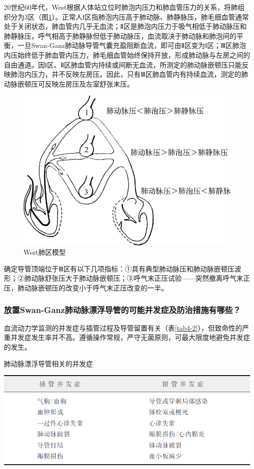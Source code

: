 20世纪60年代，West根据人体站立位时肺泡内压力和肺血管压力的关系，将肺组织分为3区（图\ref{fig4-7}）。正常人Ⅰ区指肺泡内压高于肺动脉、肺静脉压，肺毛细血管通常处于关闭状态，肺血管内几乎无血流；Ⅱ区是肺泡内压力于吸气相低于肺动脉压和肺静脉压，呼气相高于肺静脉但低于肺动脉压，血流取决于肺动脉和肺泡间的平衡，一旦Swan-Ganz肺动脉导管气囊充盈阻断血流，即可由Ⅱ区变为Ⅰ区；Ⅲ区肺泡内压始终低于肺血管内压力，肺毛细血管始终保持开放，形成肺动脉与左房之间的自由通道。因Ⅰ区、Ⅱ区肺血管内持续或间断无血流，所测定的肺动脉嵌顿压只能反映肺泡内压力，并不反映左房压。因此，只有Ⅲ区肺血管内有持续血流，测定的肺动脉嵌顿压可反映左房压及左室舒张末压。

\begin{figure}[!htbp]
 \centering
 \includegraphics{./images/Image00035.jpg}
 \captionsetup{justification=centering}
 \caption{West肺区模型}
 \label{fig4-7}
  \end{figure} 

确定导管顶端位于Ⅲ区有以下几项指标：①具有典型肺动脉压和肺动脉嵌顿压波形；②肺动脉舒张压大于肺动脉嵌顿压；③呼气末正压试验------突然撤离呼气末正压，肺动脉嵌顿压的改变小于呼气末正压改变的一半。

\subsubsection{放置Swan-Ganz肺动脉漂浮导管的可能并发症及防治措施有哪些？}

血流动力学监测的并发症与插管过程及导管留置有关（表\ref{tab4-2}），但致命性的严重并发症发生率并不高。遵循操作常规，严守无菌原则，可最大限度地避免并发症的发生。

\begin{table}[htbp]
\centering
\caption{肺动脉漂浮导管相关的并发症}
\label{tab4-2}
\includegraphics{./images/Image00036.jpg}
\end{table}

